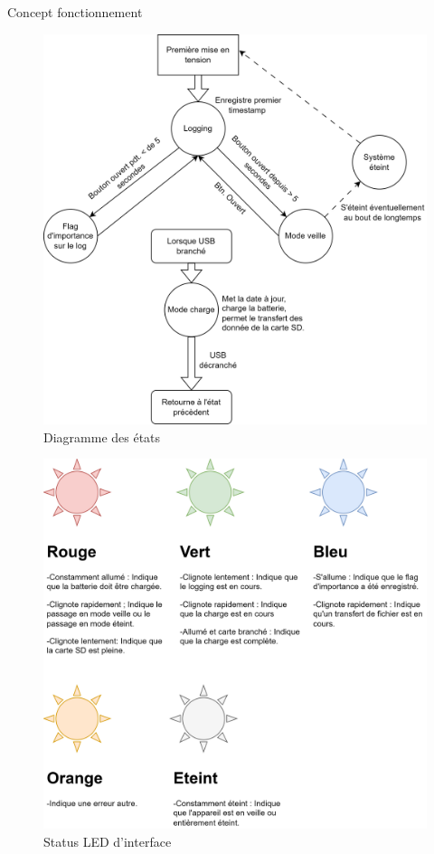 \documentclass[compress,aspectratio=169]{beamer}
\begin{document}
\begin{frame}[containsverbatim]{Concept fonctionnement}
	\begin{figure}
		\centering
		\includegraphics[width=0.5\linewidth]{Images/Dev-SCH/Etats_diagramme}
		\caption{Diagramme des états}
		\label{fig:etatsdiagramme}
	\end{figure}
\end{frame}
 
\begin{frame}
	\begin{figure}
		\centering
		\includegraphics[width=0.55\linewidth]{Images/Dev-SCH/LEDStates}
		\caption{Status LED d'interface}
		\label{fig:ledstates}
	\end{figure}
\end{frame}
	
\end{document}
